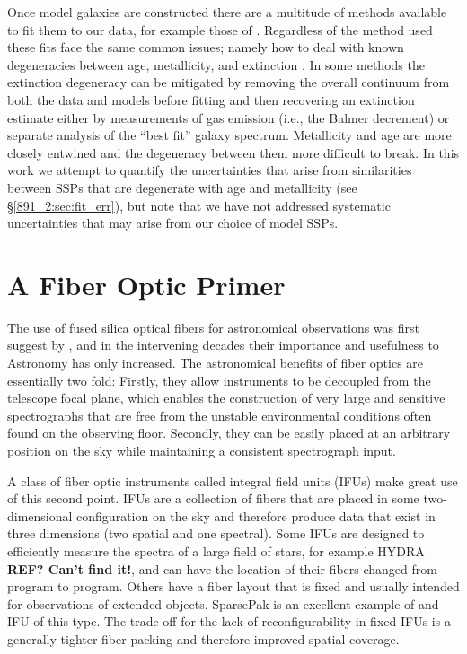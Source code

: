 Once model galaxies are constructed there are a multitude of methods
available to fit them to our data, for example those of
\citep{Cappellari04, Tojeiro07,Chen12, CidFernandes05, Ocvirk06,
  Wilkinson15, Sanchez16}. Regardless of the method used these fits
face the same common issues; namely how to deal with known
degeneracies between age, metallicity, and extinction
\citep{Oconnel76,Aaronson78,Worthey94,dePaz02}. In some methods the
extinction degeneracy can be mitigated by removing the overall
continuum from both the data and models before fitting
\citep[e.g.,][]{Ocvirk06,Wilkinson15} and then recovering an
extinction estimate either by measurements of gas emission (i.e., the
Balmer decrement) or separate analysis of the ``best fit'' galaxy
spectrum. Metallicity and age are more closely entwined and the
degeneracy between them more difficult to break. In this work we
attempt to quantify the uncertainties that arise from similarities
between SSPs that are degenerate with age and metallicity (see
\S\ref{891_2:sec:fit_err}), but note that we have not addressed systematic
uncertainties that may arise from our choice of model SSPs.

\section{A Fiber Optic Primer}
\label{intro:sec:fiber}
The use of fused silica optical fibers for astronomical observations
was first suggest by \citet{Angel77}, and in the intervening decades
their importance and usefulness to Astronomy has only increased. The
astronomical benefits of fiber optics are essentially two fold:
Firstly, they allow instruments to be decoupled from the telescope
focal plane, which enables the construction of very large and
sensitive spectrographs that are free from the unstable environmental
conditions often found on the observing floor. Secondly, they can be
easily placed at an arbitrary position on the sky while maintaining a
consistent spectrograph input.

A class of fiber optic instruments called integral field units (IFUs)
make great use of this second point. IFUs are a collection of fibers
that are placed in some two-dimensional configuration on the sky and
therefore produce data that exist in three dimensions (two spatial and
one spectral). Some IFUs are designed to efficiently measure the
spectra of a large field of stars, for example HYDRA {\bf REF? Can't
  find it!}, and can have the location of their fibers changed from
program to program. Others have a fiber layout that is fixed and
usually intended for observations of extended objects. SparsePak
\citep{Bershady04,Bershady05} is an excellent example of and IFU of
this type. The trade off for the lack of reconfigurability in fixed
IFUs is a generally tighter fiber packing and therefore improved
spatial coverage.

